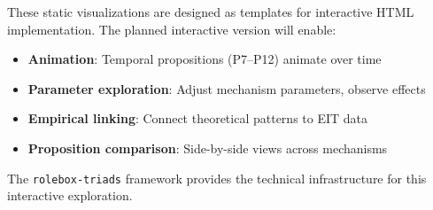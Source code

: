 \documentclass[../main.tex]{subfiles}
\begin{document}
\begin{insightbox}
These static visualizations are designed as templates for interactive HTML implementation. The planned interactive version will enable:
\begin{itemize}[leftmargin=*, itemsep=0.1em]
\item \textbf{Animation}: Temporal propositions (P7--P12) animate over time
\item \textbf{Parameter exploration}: Adjust mechanism parameters, observe effects
\item \textbf{Empirical linking}: Connect theoretical patterns to EIT data
\item \textbf{Proposition comparison}: Side-by-side views across mechanisms
\end{itemize}
The \texttt{rolebox-triads} framework provides the technical infrastructure for this interactive exploration.
\end{insightbox}

\end{document}

